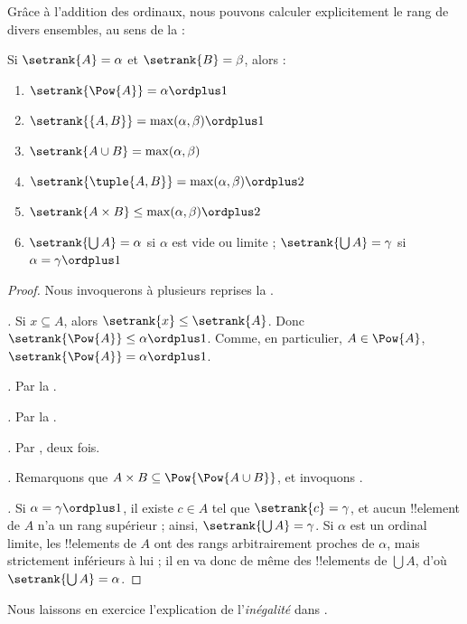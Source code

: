 \documentclass[../../../include/open-logic-section]{subfiles}
\begin{document}

Grâce à l'addition des ordinaux, nous pouvons calculer
explicitement le rang de divers ensembles, au sens de la
 :

\begin{lem}
Si $\setrank{A} = \alpha$ et $\setrank{B} = \beta$, alors :
\begin{enumerate}
	\item{}
	$\setrank{\Pow{A}} = \alpha\ordplus 1$
	\item{}
	$\setrank{\{A, B\}} = \max(\alpha,\beta) \ordplus 1$
	\item{}
	$\setrank{A \cup B} = \max(\alpha,\beta)$
	\item{}
	$\setrank{\tuple{A,B}} = \max(\alpha,\beta) \ordplus 2$
	\item{}
	$\setrank{A \times B} \leq \max(\alpha,\beta)
	\ordplus 2$
	\item{}
	$\setrank{\bigcup A} = \alpha$ si $\alpha$ est
	vide ou limite ; $\setrank{\bigcup A} = \gamma$
	si $\alpha = \gamma\ordplus 1$
\end{enumerate}
\end{lem}

\begin{proof}
Nous invoquerons à plusieurs reprises
la .

\emph{.} Si $x \subseteq A$, alors
$\setrank{x} \leq \setrank{A}$. Donc
$\setrank{\Pow{A}} \leq \alpha \ordplus 1$.
Comme, en particulier, $A \in \Pow{A}$,
$\setrank{\Pow{A}} = \alpha \ordplus 1$.

\emph{.} Par la
.

\emph{.} Par la
.

\emph{.} Par
, deux fois.

\emph{.} Remarquons que
$A \times B \subseteq \Pow{\Pow{A \cup B}}$,
et invoquons .

\emph{.} Si
$\alpha = \gamma\ordplus 1$, il existe
$c \in A$ tel que $\setrank{c} = \gamma$,
et aucun !!{element} de $A$ n'a un rang supérieur ;
ainsi, $\setrank{\bigcup A} = \gamma$.
Si $\alpha$ est un ordinal limite, les !!{element}s
de $A$ ont des rangs arbitrairement proches de
$\alpha$, mais strictement inférieurs à lui ;
il en va donc de même des !!{element}s de
$\bigcup A$, d'où
$\setrank{\bigcup A} = \alpha$.
\end{proof}
\noindent
Nous laissons en exercice l'explication de
l'\emph{inégalité} dans .
\end{document}
